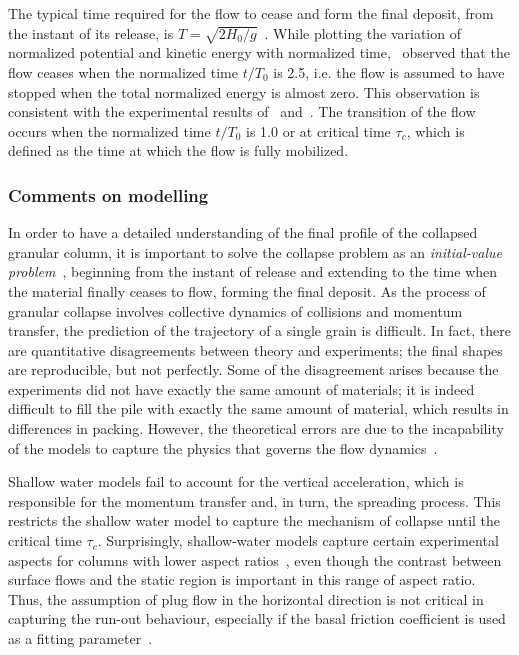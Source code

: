 The typical time required for the flow to cease and form the final 
deposit, from the instant of its release, is 
$\textit{T}=\sqrt{2\textit{H}_{\textit{0}}/\textit{g}}$~\citep{Staron2007a}. 
While plotting the variation of normalized potential and kinetic energy with 
normalized time,~\citet{Staron2007a} observed that the flow ceases when the 
normalized time $\textit{t}/\textit{T}_0$ is 2.5, i.e. the flow is assumed to 
have stopped when the total normalized energy is almost zero. This observation 
is consistent with the experimental results of~\citet{Lube2005} 
and~\citet{Lajeunesse2005}. The transition of the flow occurs when the 
normalized time $\textit{t}/\textit{T}_0$ is 1.0 or at critical time 
$\tau_{\textit{c}}$, which is defined as the time at which the flow is fully 
mobilized.

\subsubsection{Comments on modelling}

In order to have a detailed understanding of the final profile of the collapsed 
granular column, it is important to solve the collapse problem as an 
\textit{initial-value problem}~\citep{Balmforth2005}, beginning from the 
instant of release and extending to the time when the material finally ceases 
to flow, forming the final deposit. As the process of granular collapse 
involves collective dynamics of collisions and momentum transfer, the 
prediction of the trajectory of a single grain is difficult. In fact, there are 
quantitative disagreements between theory and experiments; the final shapes are 
reproducible, but not perfectly. Some of the disagreement arises because the 
experiments did not have exactly the same amount of materials; it is indeed 
difficult to fill the pile with exactly the same amount of material, which 
results in differences in packing. However, the theoretical errors are due to 
the incapability of the models to capture the physics that governs the flow 
dynamics~\citep{Balmforth2005}. 

Shallow water models fail to account for the 
vertical acceleration, which is responsible for the momentum transfer and, in 
turn, the spreading process. This restricts the shallow water model to capture 
the mechanism of collapse until the critical time $\tau_{\textit{c}}$. 
Surprisingly, shallow-water models capture certain experimental aspects for 
columns with lower aspect 
ratios~\citep{Mangeney2010,Balmforth2005,Kerswell2005}, even though the 
contrast between surface flows and the static region is important in this range 
of aspect ratio. Thus, the assumption of plug flow in the horizontal direction 
is not critical in capturing the run-out behaviour, especially if the basal 
friction coefficient is used as a fitting parameter~\citep{Lajeunesse2005}. 


